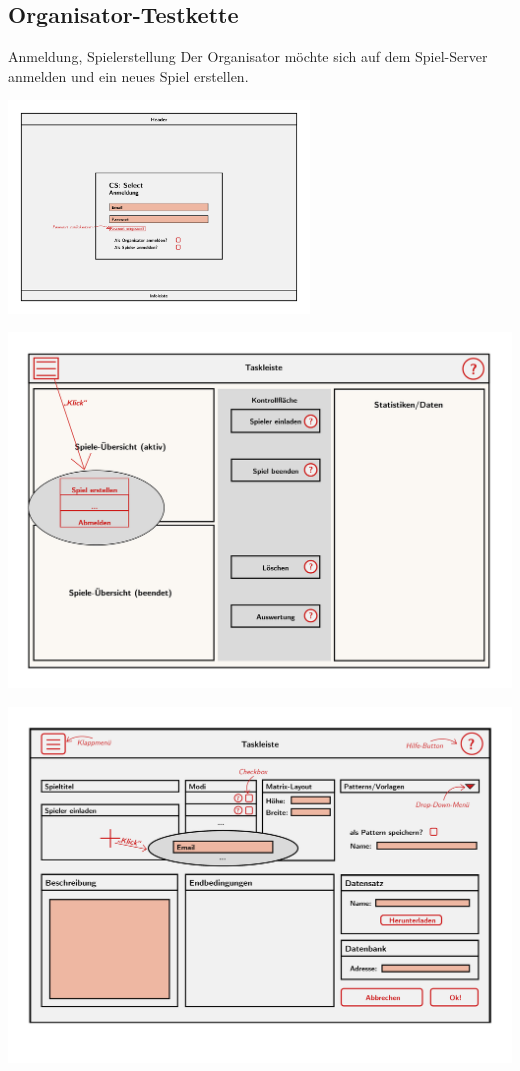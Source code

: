 \documentclass[xcolor=dvipsnames]{beamer}
\begin{document}
    \subsection{Organisator-Testkette}
    \begin{frame}
        \begin{block} {Anmeldung, Spielerstellung}
            Der Organisator möchte sich auf dem Spiel-Server anmelden und ein neues Spiel erstellen.
        \end{block}
        \includegraphics[width=8cm]{img/Anmeldung.jpg}
    \end{frame}
    \begin{frame}
        \includegraphics[width=\textwidth]{img/OrganisatorPres.jpg}
    \end{frame}
    \begin{frame}
         \includegraphics[width=\textwidth]{img/Spielerstellung.jpg}
    \end{frame}
\end{document}
